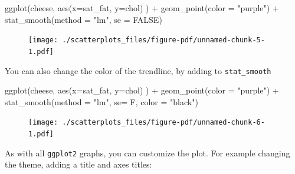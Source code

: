 \documentclass[
  letterpaper,
  DIV=11,
  numbers=noendperiod]{scrreprt}
\newenvironment{Shaded}{\begin{snugshade}}{\end{snugshade}}
\newcommand{\AttributeTok}[1]{\textcolor[rgb]{0.40,0.45,0.13}{#1}}
\newcommand{\ConstantTok}[1]{\textcolor[rgb]{0.56,0.35,0.01}{#1}}
\newcommand{\FunctionTok}[1]{\textcolor[rgb]{0.28,0.35,0.67}{#1}}
\newcommand{\NormalTok}[1]{\textcolor[rgb]{0.00,0.23,0.31}{#1}}
\newcommand{\SpecialCharTok}[1]{\textcolor[rgb]{0.37,0.37,0.37}{#1}}
\newcommand{\StringTok}[1]{\textcolor[rgb]{0.13,0.47,0.30}{#1}}
\begin{document}
\begin{Shaded}
\begin{Highlighting}[]
\FunctionTok{ggplot}\NormalTok{(cheese, }\FunctionTok{aes}\NormalTok{(}\AttributeTok{x=}\NormalTok{sat\_fat, }\AttributeTok{y=}\NormalTok{chol) ) }\SpecialCharTok{+} 
  \FunctionTok{geom\_point}\NormalTok{(}\AttributeTok{color =} \StringTok{"purple"}\NormalTok{) }\SpecialCharTok{+}
 \FunctionTok{stat\_smooth}\NormalTok{(}\AttributeTok{method =} \StringTok{"lm"}\NormalTok{, }\AttributeTok{se =} \ConstantTok{FALSE}\NormalTok{)}
\end{Highlighting}
\end{Shaded}

\begin{figure}[H]

{\centering \texttt{[image: ./scatterplots\_files/figure-pdf/unnamed-chunk-5-1.pdf]}

}

\end{figure}

You can also change the color of the trendline, by adding to
\texttt{stat\_smooth}

\begin{Shaded}
\begin{Highlighting}[]
\FunctionTok{ggplot}\NormalTok{(cheese, }\FunctionTok{aes}\NormalTok{(}\AttributeTok{x=}\NormalTok{sat\_fat, }\AttributeTok{y=}\NormalTok{chol) ) }\SpecialCharTok{+} 
  \FunctionTok{geom\_point}\NormalTok{(}\AttributeTok{color =} \StringTok{"purple"}\NormalTok{) }\SpecialCharTok{+}
  \FunctionTok{stat\_smooth}\NormalTok{(}\AttributeTok{method =} \StringTok{"lm"}\NormalTok{, }\AttributeTok{se=}\NormalTok{ F, }\AttributeTok{color =} \StringTok{"black"}\NormalTok{)}
\end{Highlighting}
\end{Shaded}

\begin{figure}[H]

{\centering \texttt{[image: ./scatterplots\_files/figure-pdf/unnamed-chunk-6-1.pdf]}

}

\end{figure}

As with all \texttt{ggplot2} graphs, you can customize the plot. For
example changing the theme, adding a title and axes titles:
\end{document}
